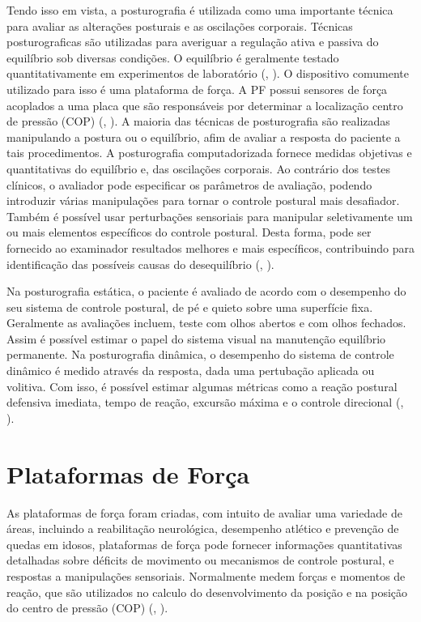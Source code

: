 Tendo isso em vista, a posturografia é utilizada como uma importante técnica para avaliar as alterações posturais e as oscilações corporais. Técnicas posturograficas são utilizadas para averiguar a regulação ativa e passiva do equilíbrio sob diversas condições. O equilíbrio é geralmente testado quantitativamente em experimentos de laboratório (\citeauthor{browne2000development}, \citeyear{browne2000development}). O dispositivo comumente utilizado para isso é uma plataforma de força.  A PF possui sensores de força acoplados a uma placa que são responsáveis por determinar a localização centro de pressão (COP) (\citeauthor{leach2014validating}, \citeyear{leach2014validating}). A  maioria das técnicas de posturografia são realizadas manipulando a postura ou o equilíbrio, afim de avaliar a resposta do paciente a tais procedimentos. A posturografia computadorizada fornece medidas objetivas e quantitativas do equilíbrio e, das oscilações corporais. Ao contrário dos testes clínicos, o avaliador pode especificar os parâmetros de avaliação, podendo introduzir várias manipulações para tornar o controle postural mais desafiador. Também é possível usar perturbações sensoriais para manipular seletivamente um ou mais elementos específicos do controle postural. Desta forma, pode ser fornecido ao examinador resultados melhores e mais específicos, contribuindo para identificação  das possíveis causas do desequilíbrio (\citeauthor{visser2008clinical}, \citeyear{visser2008clinical}).


Na posturografia estática, o paciente é avaliado de acordo com o desempenho do seu sistema de controle postural, de pé e quieto sobre uma superfície fixa. Geralmente as avaliações incluem, teste com olhos abertos e com olhos fechados. Assim é possível estimar o papel do sistema visual na manutenção equilíbrio permanente. Na posturografia dinâmica, o desempenho do sistema de controle dinâmico é medido através da resposta, dada uma pertubação aplicada ou volitiva. Com isso, é possível estimar algumas métricas como a reação postural defensiva imediata, tempo de reação, excursão máxima e o controle direcional (\citeauthor{prieto1996measures}, \citeyear{prieto1996measures}).


\section{Plataformas de Força}
As plataformas de força foram criadas, com intuito de avaliar uma variedade de áreas, incluindo a reabilitação neurológica, desempenho atlético e prevenção de quedas em idosos, plataformas de força pode fornecer informações quantitativas detalhadas sobre déficits de movimento ou mecanismos de controle postural, e respostas a manipulações sensoriais. Normalmente medem
forças e momentos de reação, que são utilizados no calculo do desenvolvimento da
posição e na posição do centro de pressão (COP)  (\citeauthor{clark2018reliability}, \citeyear{clark2018reliability}).

